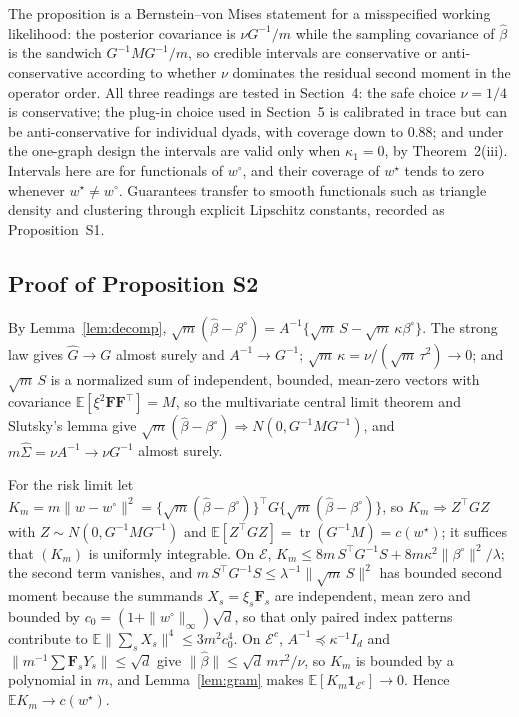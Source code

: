 \documentclass[12pt]{article}
\newcommand{\E}{\mathbb{E}}
\newcommand{\tr}{\operatorname{tr}}
\newcommand{\supn}[1]{\|#1\|_{\infty}}
\newcommand{\norm}[1]{\|#1\|}
\newcommand{\wstar}{w^{\star}}
\newcommand{\wproj}{w^{\circ}}
\newcommand{\bproj}{\beta^{\circ}}
\newcommand{\what}{\hat w}
\newcommand{\bhat}{\hat\beta}
\newcommand{\Sighat}{\hat\Sigma}
\newcommand{\Ghat}{\hat G}
\newcommand{\Fv}{\mathbf{F}}
\newcommand{\ind}{\mathbf{1}}
\begin{document}
The proposition is a Bernstein--von Mises statement for a misspecified working likelihood: the posterior covariance is $\nu G^{-1}/m$ while the sampling covariance of $\bhat$ is the sandwich $G^{-1}MG^{-1}/m$, so credible intervals are conservative or anti-conservative according to whether $\nu$ dominates the residual second moment in the operator order. All three readings are tested in Section~4: the safe choice $\nu=1/4$ is conservative; the plug-in choice used in Section~5 is calibrated in trace but can be anti-conservative for individual dyads, with coverage down to $0.88$; and under the one-graph design the intervals are valid only when $\kappa_1=0$, by Theorem~2(iii). Intervals here are for functionals of $\wproj$, and their coverage of $\wstar$ tends to zero whenever $\wstar\neq\wproj$. Guarantees transfer to smooth functionals such as triangle density and clustering through explicit Lipschitz constants, recorded as Proposition~S1.

\subsection*{Proof of Proposition S2}

By Lemma~\ref{lem:decomp}, $\sqrt m(\bhat-\bproj)=A^{-1}\{\sqrt m\,S-\sqrt m\,\kappa\bproj\}$. The strong law gives $\Ghat\to G$ almost surely and $A^{-1}\to G^{-1}$; $\sqrt m\,\kappa=\nu/(\sqrt m\,\tau^2)\to0$; and $\sqrt m\,S$ is a normalized sum of independent, bounded, mean-zero vectors with covariance $\E[\xi^2\Fv\Fv^{\top}]=M$, so the multivariate central limit theorem and Slutsky's lemma give $\sqrt m(\bhat-\bproj)\Rightarrow N(0,G^{-1}MG^{-1})$, and $m\Sighat=\nu A^{-1}\to\nu G^{-1}$ almost surely.

For the risk limit let $K_m=m\norm{\what-\wproj}^2=\{\sqrt m(\bhat-\bproj)\}^{\top}G\{\sqrt m(\bhat-\bproj)\}$, so $K_m\Rightarrow Z^{\top}GZ$ with $Z\sim N(0,G^{-1}MG^{-1})$ and $\E[Z^{\top}GZ]=\tr(G^{-1}M)=c(\wstar)$; it suffices that $(K_m)$ is uniformly integrable. On $\mathcal{E}$, $K_m\le8m\,S^{\top}G^{-1}S+8m\kappa^2\norm{\bproj}^2/\lambda$; the second term vanishes, and $m\,S^{\top}G^{-1}S\le\lambda^{-1}\norm{\sqrt m\,S}^2$ has bounded second moment because the summands $X_s=\xi_s\Fv_s$ are independent, mean zero and bounded by $c_0=(1+\supn{\wproj})\sqrt d$, so that only paired index patterns contribute to $\E\norm{\sum_sX_s}^4\le3m^2c_0^4$. On $\mathcal{E}^c$, $A^{-1}\preceq\kappa^{-1}I_d$ and $\norm{m^{-1}\sum\Fv_sY_s}\le\sqrt d$ give $\norm{\bhat}\le\sqrt d\,m\tau^2/\nu$, so $K_m$ is bounded by a polynomial in $m$, and Lemma~\ref{lem:gram} makes $\E[K_m\ind_{\mathcal{E}^c}]\to0$. Hence $\E K_m\to c(\wstar)$.
\end{document}
